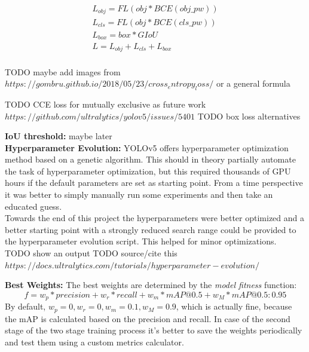 \begin{equation}
  \begin{array}{l}
    L_{obj} = FL(obj * BCE(obj\_pw)) \\
    L_{cls} = FL(obj * BCE(cls\_pw)) \\
    L_{box} = box * GIoU \\
    L = L_{obj} + L_{cls} + L_{box} \\
  \end{array}
\end{equation}

TODO maybe add images from $https://gombru.github.io/2018/05/23/cross_entropy_loss/$ or a general formula

TODO CCE loss for mutually exclusive as future work $https://github.com/ultralytics/yolov5/issues/5401$
TODO box loss alternatives


\textbf{IoU threshold:}
maybe later \\



\textbf{Hyperparameter Evolution:}
YOLOv5 offers hyperparameter optimization method based on a genetic algorithm. This should in theory partially automate the task of hyperparameter optimization, but this required thousands of GPU hours if the default parameters are set as starting point. From a time perspective it was better to simply manually run some experiments and then take an educated guess. \\
Towards the end of this project the hyperparameters were better optimized and a better starting point with a  strongly reduced search range could be provided to the hyperparameter evolution script. This helped for minor optimizations. \\
TODO show an output
TODO source/cite this $https://docs.ultralytics.com/tutorials/hyperparameter-evolution/$

\textbf{Best Weights:}
The best weights are determined by the \textit{model fitness} function:
\begin{equation}
f = w_p * precision + w_r * recall + w_m * mAP@0.5 + w_M * mAP@0.5:0.95
\end{equation}
By default, $w_p=0, w_r=0, w_m=0.1, w_M=0.9$, which is actually fine, because the mAP is calculated based on the precision and recall. In case of the second stage of the two stage training process it's better to save the weights periodically and test them using a custom metrics calculator. \\


